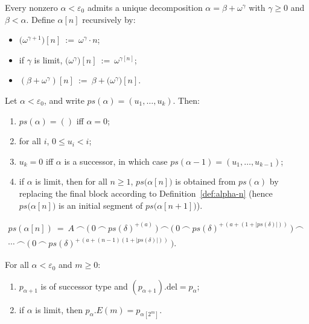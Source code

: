 \documentclass[10pt,a4paper]{amsart}
\begin{document}
\begin{definition}\label{def:alpha-n}
Every nonzero $\alpha<\varepsilon_0$ admits a unique decomposition $\alpha=\beta+\omega^\gamma$ with $\gamma\ge 0$ and $\beta<\alpha$.
Define $\alpha[n]$ recursively by:
\begin{itemize}
  \item $\bigl(\omega^{\gamma+1}\bigr)[n]\ :=\ \omega^\gamma\cdot n$;
  \item if $\gamma$ is limit, $\bigl(\omega^\gamma\bigr)[n]\ :=\ \omega^{\gamma[n]}$;
  \item $(\beta+\omega^\gamma)[n]\ :=\ \beta+\bigl(\omega^\gamma\bigr)[n]$.
\end{itemize}
\end{definition}

\begin{lemma}\label{lem:ps-basic}
Let $\alpha<\varepsilon_0$, and write $ps(\alpha)=(u_1,\ldots,u_k)$.
Then:
\begin{enumerate}
  \item $ps(\alpha)=()$ iff $\alpha=0$;
  \item for all $i$, $0\le u_i<i$;
  \item $u_k=0$ iff $\alpha$ is a successor, in which case $ps(\alpha-1)=(u_1,\ldots,u_{k-1})$;
  \item if $\alpha$ is limit, then for all $n\ge 1$, $ps\bigl(\alpha[n]\bigr)$ is obtained from $ps(\alpha)$ by replacing the final block according to Definition~\ref{def:alpha-n} (hence $ps\bigl(\alpha[n]\bigr)$ is an initial segment of $ps\bigl(\alpha[n+1]\bigr)$).
\end{enumerate}
\end{lemma}

\begin{multline}\label{eq:succ-tail}
ps(\alpha[n])\ =\ A\ \frown\ \bigl(\ 0\ \frown\ ps(\delta)^{+(a)}\ \bigr)\ \frown\ \bigl(\ 0\ \frown\ ps(\delta)^{+\,(a+(1+|ps(\delta)|))}\ \bigr)\ \frown\ \\ \cdots\ \frown\  \bigl(\ 0\ \frown\ ps(\delta)^{+\,(a+(n-1)(1+|ps(\delta)|))}\ \bigr).
\end{multline}

\begin{lemma}\label{lem:palpha-successor-limit}
For all $\alpha<\varepsilon_0$ and $m\ge 0$:
\begin{enumerate}
  \item $p_{\alpha+1}$ is of successor type and $(p_{\alpha+1}).{\mathrm{del}}=p_\alpha$;
  \item if $\alpha$ is limit, then $p_\alpha.E(m)=p_{\alpha[2^m]}$.
\end{enumerate}
\end{lemma}
\end{document}
